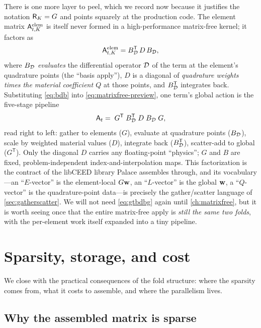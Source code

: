 There is one more layer to peel, which we record now because it justifies the
notation $\mathsf{R}_K=G$ and points squarely at the production code. The element
matrix $\mathsf{A}^{\mathrm{elem}}_{t,K}$ is itself never formed in a high-performance
matrix-free kernel; it factors as
\begin{equation}
\mathsf{A}^{\mathrm{elem}}_{t,K}=B^{\mathsf T}_{\mathcal{D}}\,D\,B_{\mathcal{D}},
\label{eq:bdb}
\end{equation}
where $B_{\mathcal{D}}$ \emph{evaluates} the differential operator $\mathcal{D}$ of the
term at the element's quadrature points (the ``basis apply''), $D$ is a diagonal
of \emph{quadrature weights times the material coefficient $Q$} at those points,
and $B^{\mathsf T}_{\mathcal{D}}$ integrates back. Substituting \cref{eq:bdb} into
\cref{eq:matrixfree-preview}, one term's global action is the five-stage pipeline
\begin{equation}
\mathsf{A}_t=\;G^{\mathsf T}\;B^{\mathsf T}_{\mathcal{D}}\;D\;B_{\mathcal{D}}\;G,
\label{eq:gtbdbg}
\end{equation}
read right to left: gather to elements ($G$), evaluate at quadrature points
($B_{\mathcal{D}}$), scale by weighted material values ($D$), integrate back
($B^{\mathsf T}_{\mathcal{D}}$), scatter-add to global ($G^{\mathsf T}$). Only the
diagonal $D$ carries any floating-point ``physics''; $G$ and $B$ are fixed,
problem-independent index-and-interpolation maps. This factorization is the
contract of the libCEED library Palace assembles through, and its vocabulary---an
``$E$-vector'' is the element-local $G\mathbf{w}$, an ``$L$-vector'' is the global $\mathbf{w}$,
a ``$Q$-vector'' is the quadrature-point data---is precisely the gather/scatter
language of \cref{sec:gatherscatter}. We will not need \cref{eq:gtbdbg} again until
\cref{ch:matrixfree}, but it is worth seeing once that the entire matrix-free
apply is \emph{still the same two folds}, with the per-element work itself expanded
into a tiny pipeline.

\section{Sparsity, storage, and cost}
\label{sec:cost}

We close with the practical consequences of the fold structure: where the
sparsity comes from, what it costs to assemble, and where the parallelism lives.

\subsection{Why the assembled matrix is sparse}

